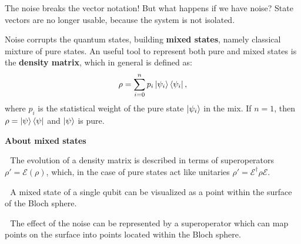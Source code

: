 \documentclass[aspectratio=169, 8pt, xcolor={svgnames}, hyperref={linkcolor=black}]{beamer}
\begin{document}
\begin{frame}{The noise breaks the vector notation!}
\textcolor{carnelian}{But what happens if we have noise?} \pause State vectors 
are no longer usable, because the system is not isolated. \pause

Noise corrupts the quantum states, building \textbf{mixed states}, namely classical 
mixture of pure states. \pause An useful tool to represent both pure and mixed states is the \textbf{density matrix}, 
which in general is defined as:
$$ \rho = \sum_{i=0}^n p_i \ket{\psi_i}\bra{\psi_i}, $$
where $p_i$ is the statistical weight of the pure state $\ket{\psi_i}$ in the mix. 
If $n=1$, then $\rho=\ket{\psi}\bra{\psi}$ and $\ket{\psi}$ is pure. \pause

\begin{multicols}{2}
\textbf{About mixed states}

{\footnotesize\faCircle\,\,} The evolution of a density matrix is described in terms 
of superoperators $\rho' = \mathcal{E} (\rho)$, which, in the case of pure states 
act like unitaries $ \rho' = \mathcal{E}^{\dagger} \rho \mathcal{E}. $ 

{\footnotesize\faCircle\,\,} A mixed state of a single qubit can be visualized as a point within the surface
of the Bloch sphere. 

{\footnotesize\faCircle\,\,} The effect of the noise can be represented by a superoperator
which can map points on the surface into points located within the Bloch sphere.     
\begin{center}
\end{center}
\end{multicols}

\end{frame}
\end{document}

